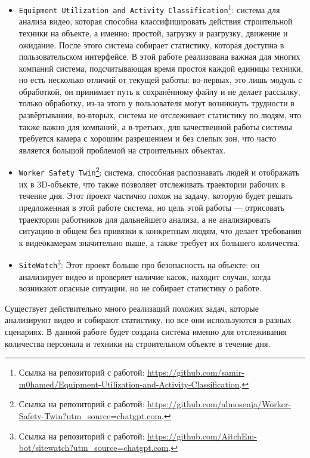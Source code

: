 \begin{itemize}
    \item \texttt{Equipment Utilization and Activity Classification}\footnote{Ссылка на репозиторий с работой: \url{https://github.com/samir-m0hamed/Equipment-Utilization-and-Activity-Classification}.}:
    система для анализа видео, которая способна классифицировать действия строительной техники на объекте,
    а именно: простой, загрузку и разгрузку, движение и ожидание. После этого система собирает статистику,
    которая доступна в пользовательском интерфейсе.
    В этой работе реализована важная для многих компаний система, подсчитывающая время простоя каждой единицы техники,
    но есть несколько отличий от текущей работы: во-первых, это лишь модуль с обработкой,
    он принимает путь к сохранённому файлу и не делает рассылку, только обработку,
    из-за этого у пользователя могут возникнуть трудности в развёртывании,
    во-вторых, система не отслеживает статистику по людям, что также важно для компаний,
    а в-третьих, для качественной работы системы требуется камера с хорошим разрешением и без слепых зон,
    что часто является большой проблемой на строительных объектах.

    \item \texttt{Worker Safety Twin}\footnote{Ссылка на репозиторий с работой: \url{https://github.com/almosenja/Worker-Safety-Twin?utm_source=chatgpt.com}.}:
    система, способная распознавать людей и отображать их в 3D-объекте, что также позволяет отслеживать траектории рабочих в течение дня.
    Этот проект частично похож на задачу, которую будет решать предложенная в этой работе система,
    но цель этой работы --- отрисовать траектории работников для дальнейшего анализа,
    а не анализировать ситуацию в общем без привязки к конкретным людям,
    что делает требования к видеокамерам значительно выше, а также требует их большего количества.

    \item \texttt{SiteWatch}\footnote{Ссылка на репозиторий с работой: \url{https://github.com/AitchEm-bot/sitewatch?utm_source=chatgpt.com}.}:
    Этот проект больше про безопасность на объекте: он анализирует видео и проверяет наличие касок,
    находит случаи, когда возникают опасные ситуации, но не собирает статистику о работе.

\end{itemize}

Существует действительно много реализаций похожих задач, которые анализируют видео и собирают статистику,
но все они используются в разных сценариях.
В данной работе будет создана система именно для отслеживания количества персонала и техники
на строительном объекте в течение дня.


